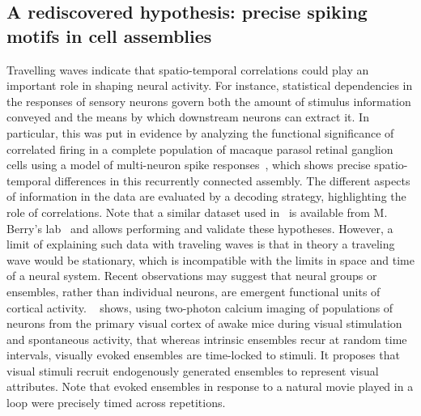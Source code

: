 \documentclass[brainsci, %
               review,submit,pdftex,moreauthors
               ]{Definitions/mdpi}
\begin{document}
\subsection{A rediscovered hypothesis: precise spiking motifs in cell assemblies}
Travelling waves indicate that spatio-temporal correlations could play an important role in shaping neural activity. For instance, statistical dependencies in the responses of sensory neurons govern both the amount of stimulus information conveyed and the means by which downstream neurons can extract it. In particular, this was put in evidence by analyzing the functional significance of correlated firing in a complete population of macaque parasol retinal ganglion cells using a model of multi-neuron spike responses~\citep{pillow_spatio-temporal_2008}, which shows precise spatio-temporal differences in this recurrently connected assembly. The different aspects of information in the data are evaluated by a decoding strategy, highlighting the role of correlations. Note that a similar dataset used in~\citep{schneidman_weak_2006} is available from M. Berry's lab~\citep{berry_spike_2022} and allows performing and validate these hypotheses. However, a limit of explaining such data with traveling waves is that in theory a traveling wave would be stationary, which is incompatible with the limits in space and time of a neural system. Recent observations may suggest that neural groups or ensembles, rather than individual neurons, are emergent functional units of cortical activity. ~\citep{miller_visual_2014} shows, using two-photon calcium imaging of populations of neurons from the primary visual cortex of awake mice during visual stimulation and spontaneous activity, that whereas intrinsic ensembles recur at random time intervals, visually evoked ensembles are time-locked to stimuli. It proposes that visual stimuli recruit endogenously generated ensembles to represent visual attributes. Note that evoked ensembles in response to a natural movie played in a loop were precisely timed across repetitions. %
\end{document}
